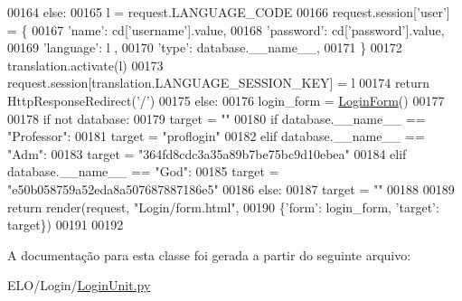 \begin{DoxyCode}
00164                 \textcolor{keywordflow}{else}:
00165                     l = request.LANGUAGE\_CODE
00166                 request.session[\textcolor{stringliteral}{'user'}] = \{
00167                                 \textcolor{stringliteral}{'name'}: cd[\textcolor{stringliteral}{'username'}].value,
00168                                 \textcolor{stringliteral}{'password'}: cd[\textcolor{stringliteral}{'password'}].value,
00169                                 \textcolor{stringliteral}{'language'}: l ,
00170                                 \textcolor{stringliteral}{'type'}: database.\_\_name\_\_,
00171                             \}
00172                 translation.activate(l)
00173                 request.session[translation.LANGUAGE\_SESSION\_KEY] = l
00174                 \textcolor{keywordflow}{return} HttpResponseRedirect(\textcolor{stringliteral}{'/'})
00175         \textcolor{keywordflow}{else}:
00176             login\_form = \hyperlink{classLogin_1_1forms_1_1LoginForm}{LoginForm}()
00177 
00178             \textcolor{keywordflow}{if} \textcolor{keywordflow}{not} database:
00179                 target = \textcolor{stringliteral}{""}
00180             \textcolor{keywordflow}{if} database.\_\_name\_\_ == \textcolor{stringliteral}{"Professor"}:
00181                 target = \textcolor{stringliteral}{"proflogin"}
00182             \textcolor{keywordflow}{elif} database.\_\_name\_\_ == \textcolor{stringliteral}{"Adm"}:
00183                 target = \textcolor{stringliteral}{"364fd8cdc3a35a89b7be75bc9d10ebea"}
00184             \textcolor{keywordflow}{elif} database.\_\_name\_\_ == \textcolor{stringliteral}{"God"}:
00185                 target = \textcolor{stringliteral}{"e50b058759a52eda8a507687887186e5"}
00186             \textcolor{keywordflow}{else}:
00187                 target = \textcolor{stringliteral}{""}
00188 
00189             \textcolor{keywordflow}{return} render(request, \textcolor{stringliteral}{"Login/form.html"}, 
00190                 \{\textcolor{stringliteral}{'form'}: login\_form, \textcolor{stringliteral}{'target'}: target\})
00191 
00192 
\end{DoxyCode}


A documentação para esta classe foi gerada a partir do seguinte arquivo\+:\begin{DoxyCompactItemize}
\item 
E\+L\+O/\+Login/\hyperlink{LoginUnit_8py}{Login\+Unit.\+py}\end{DoxyCompactItemize}
